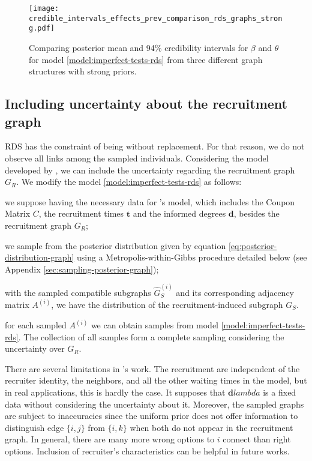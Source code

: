 \begin{figure}
  \centering
  \caption{\label{fig:credible_intervals_effects_prev_comparison_rds_graphs_strong}Comparing
  posterior mean and 94\% credibility intervals for $\beta$ and $\theta$ for model
  \eqref{model:imperfect-tests-rds} from three different graph structures with
  strong priors.}
  \texttt{[image: credible\_intervals\_effects\_prev\_comparison\_rds\_graphs\_strong.pdf]}
\end{figure}

\subsection{Including uncertainty about the recruitment graph}
\label{sec:including_uncertainty_recruitment_graph}

RDS has the constraint of being without replacement. For that reason, we do
not observe all links among the sampled individuals. Considering the model
developed by 
\textcite{crawford2016}, we can include the uncertainty regarding the
recruitment graph $G_R$. We modify the model \eqref{model:imperfect-tests-rds} as
follows: 
\begin{alineas}
  \item we suppose having the necessary data for \textcite{crawford2016}'s
  model, which includes the Coupon Matrix $C$, the recruitment times
  $\boldsymbol{t}$ and the informed degrees $\boldsymbol{d}$, besides the
  recruitment graph $G_R$;
  \item we sample from the posterior distribution given by equation
  \eqref{eq:posterior-distribution-graph} using a Metropolis-within-Gibbs
  procedure detailed below (see Appendix \ref{sec:sampling-posterior-graph});
  \item with the sampled compatible subgraphs $\hat{G}_S^{(i)}$ and its
  corresponding adjacency matrix $A^{(i)}$, we have the distribution of the
  recruitment-induced subgraph $G_S$. 
  \item for each sampled $A^{(i)}$ we can obtain samples from model
  \eqref{model:imperfect-tests-rds}. The collection of all samples form a
  complete sampling considering the uncertainty over $G_R$. 
\end{alineas}

There are several limitations in \textcite{crawford2016}'s work. The
recruitment are independent of the recruiter identity, the neighbors,
and all the other waiting times in the model, but in real applications, this is
hardly the case. It supposes that $\boldsymbol{d}lambda$ is a fixed data without
considering the uncertainty about it. Moreover, the sampled graphs are subject
to inaccuracies since the uniform prior does not offer information to
distinguish edge $\{i, j\}$ from $\{i, k\}$ when both do not appear in the
recruitment graph. In general, there are many more wrong options to $i$
connect than right options. Inclusion of recruiter's characteristics can be
helpful in future works. 

